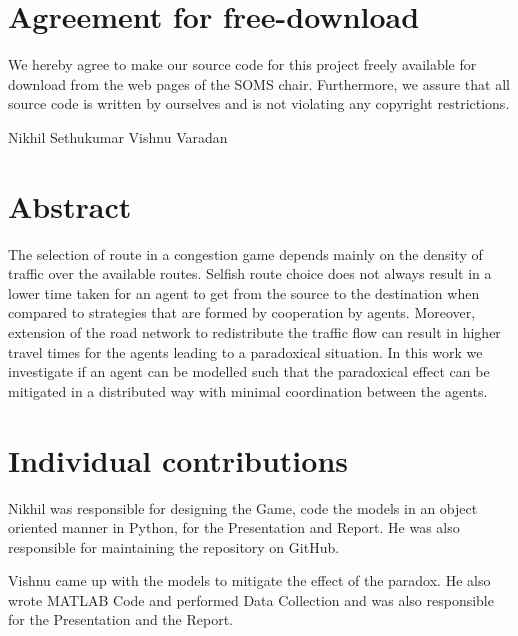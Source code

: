 \documentclass[11pt, letterpaper]{article}
\title{\projtitle}
\author{\nameA, \nameB}
\newcommand{\nameA}{Nikhil Sethukumar}
\newcommand{\nameB}{Vishnu Varadan}
\begin{document}
    

    \section*{Agreement for free-download}
    
    \large We hereby agree to make our source code for this project freely available for download from the web pages of the SOMS chair. Furthermore, we assure that all source code is written by ourselves and is not violating any copyright restrictions.

    \vfill

     \nameA {} \nameB {}

    
    
   

    
\tableofcontents

\newpage


\section{Abstract}
The selection of route in a congestion game depends mainly on the density of traffic over the available routes. Selfish route choice does not always result in a lower time taken for an agent to get from the source to the destination when compared to strategies that are formed by cooperation by agents. Moreover, extension of the road network to redistribute the traffic flow can result in higher travel times for the agents leading to a paradoxical situation. In this work we investigate if an agent can be modelled such that the paradoxical effect can be mitigated in a distributed way with minimal coordination between the agents. 


\section{Individual contributions}
Nikhil was responsible for designing the Game, code the models in an object oriented manner in Python, for the Presentation and Report. He was also responsible for maintaining the repository on GitHub.

Vishnu came up with the models to mitigate the effect of the paradox. He also wrote MATLAB Code and performed Data Collection and was also responsible for the Presentation and the Report. 
\end{document}
